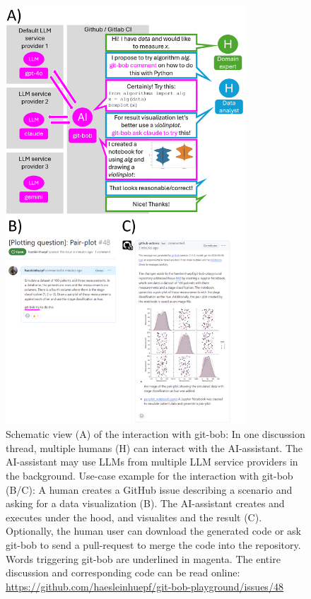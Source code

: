 \documentclass[times, twoside]{zHenriquesLab-StyleBioRxiv}
\begin{document}
\begin{figure}[h]
\centering
\includegraphics[width=0.8\textwidth]{example_interaction.png}
\caption{Schematic view (A) of the interaction with git-bob: In one discussion thread, multiple humans (H) can interact with the AI-assistant. The AI-assistant may use LLMs from multiple LLM service providers in the background. Use-case example for the interaction with git-bob (B/C): A human creates a GitHub issue describing a scenario and asking for a data visualization (B). The AI-assistant creates and executes under the hood, and visualites and the result (C). Optionally, the human user can download the generated code or ask git-bob to send a pull-request to merge the code into the repository. Words triggering git-bob are underlined in magenta. The entire discussion and corresponding code can be read online: \url{https://github.com/haesleinhuepf/git-bob-playground/issues/48}
\newline
\newline
}
\label{fig:example_interaction}
\end{figure}
\end{document}
